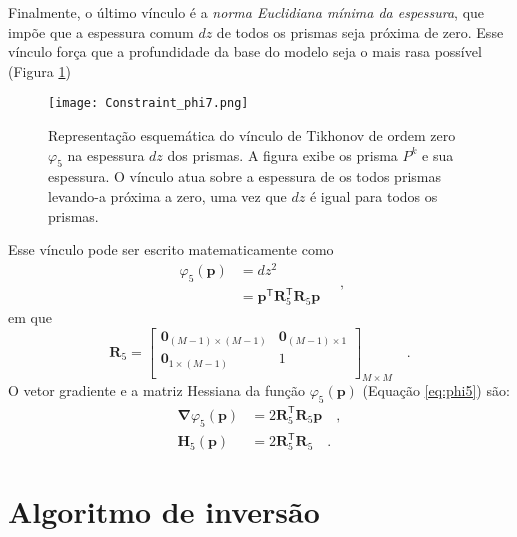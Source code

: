 Finalmente, o último vínculo é a \textit{norma Euclidiana mínima da espessura}, que impõe que a espessura comum $ dz $ de todos os prismas seja próxima de zero. Esse vínculo força que a profundidade da base do modelo seja o mais rasa possível (Figura \ref{fig:phi5})

\begin{figure}[!htb]
	\centering
	\texttt{[image: Constraint\_phi7.png]}
	\caption{Representação esquemática do vínculo de Tikhonov de ordem zero $\varphi_{5}$ na espessura $dz$ dos prismas. A figura exibe os prisma $P^k$ e sua espessura. O vínculo atua sobre a espessura de os todos prismas levando-a próxima a zero, uma vez que $dz$ é igual para todos os prismas.}
	\label{fig:phi5}
\end{figure}

Esse vínculo pode ser escrito matematicamente como
\begin{equation}\label{eq:phi5}
\begin{split}
\varphi_{5}(\mathbf{p}) &= dz^2 \\
&= \mathbf{p}^{\mathsf{T}} \mathbf{R}_{5}^{\mathsf{T}} \mathbf{R}_{5} \mathbf{p}
\end{split} \quad ,
\end{equation}
em que
\begin{equation}
\mathbf{R}_{5} =
\begin{bmatrix}
\mathbf{0}_{(M-1) \times (M-1)} & \mathbf{0}_{(M-1) \times 1} \\
\mathbf{0}_{1 \times (M-1)} & 1 \\
\end{bmatrix}_{ M \times M } \quad .
\end{equation}
O vetor gradiente e a matriz Hessiana da função $\varphi_{5}(\mathbf{p})$ (Equação \ref{eq:phi5}) são:
\begin{equation}\label{eq:phi5_gh}
\begin{split}
\boldsymbol{\nabla}\varphi_{5}(\mathbf{p}) &= 2\mathbf{R}^\mathsf{T}_{5}\mathbf{R}_{5}\mathbf{p} \quad ,\\
\mathbf{H}_{5}(\mathbf{p}) &= 2\mathbf{R}^\mathsf{T}_{5}\mathbf{R}_{5} \quad .
\end{split}
\end{equation}

\section{Algoritmo de inversão}

